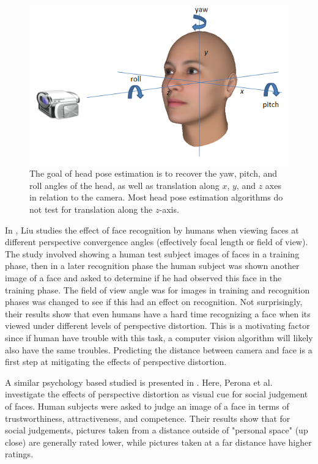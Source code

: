\documentclass[runningheads]{llncs}
\begin{document}
\begin{figure}[ht]
\centering
\includegraphics[width=.7\linewidth]{resources/figures/head_pose.png}
\caption{The goal of head pose estimation is to recover the yaw, pitch, and roll angles of the head, as well as translation along $x$, $y$, and $z$ axes in relation to the camera.  Most head pose estimation algorithms do not test for translation along the $z$-axis.}
\label{fig:head_pose}
\end{figure}

In \cite{liu2003face,liu2006face}, Liu studies the effect of face recognition by humans when viewing faces at different perspective convergence angles (effectively focal length or field of view).  The study involved showing a human test subject images of faces in a training phase, then in a later recognition phase the human subject was shown another image of a face and asked to determine if he had observed this face in the training phase.  The field of view angle was for images in training and recognition phases was changed to see if this had an effect on recognition.  Not surprisingly, their results show that even humans have a hard time recognizing a face when its viewed under different levels of perspective distortion.  This is a motivating factor since if human have trouble with this task, a computer vision algorithm will likely also have the same troubles.  Predicting the distance between camera and face is a first step at mitigating the effects of perspective distortion.

A similar psychology based studied is presented in \cite{perona2007new,bryan2012perspective}.  Here, Perona et al. investigate the effects of perspective distortion as visual cue for social judgement of faces.  Human subjects were asked to judge an image of a face in terms of trustworthiness, attractiveness, and competence.  Their results show that for social judgements, pictures taken from a distance outside of "personal space" (up close) are generally rated lower, while pictures taken at a far distance have higher ratings.
\end{document}
